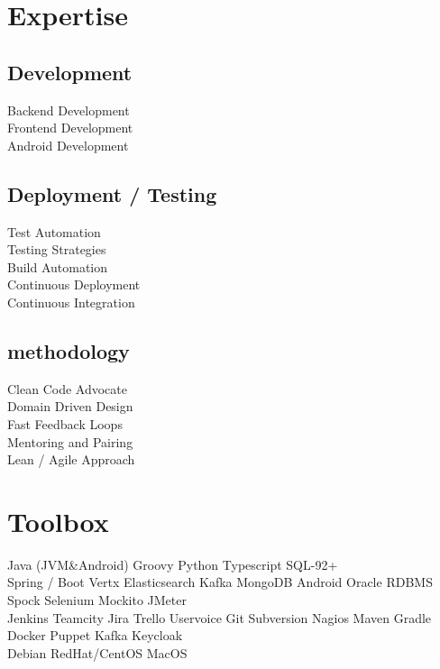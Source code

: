 \documentclass[]{resume}
\begin{document}
\begin{minipage}[t]{0.32\textwidth}

\section{Expertise}
\subsection{Development}
Backend Development \\
Frontend Development \\
Android Development \\
\sectionsep

\subsection{Deployment / Testing}
Test Automation \\
Testing Strategies \\
Build Automation \\
Continuous Deployment \\
Continuous Integration \\
\sectionsep

\subsection{methodology}
Clean Code Advocate \\
Domain Driven Design \\
Fast Feedback Loops \\
Mentoring and Pairing \\
Lean / Agile Approach \\
\sectionsep


\section{Toolbox}
Java (JVM\&Android) \textbullet{} Groovy \textbullet{} Python
\textbullet{} Typescript \textbullet{} SQL-92+\\
Spring / Boot \textbullet{} Vertx \textbullet{} Elasticsearch \textbullet{} Kafka \textbullet{} MongoDB \textbullet{} Android \textbullet{} Oracle RDBMS\\
Spock \textbullet{} Selenium \textbullet{} Mockito \textbullet{} JMeter\\
Jenkins \textbullet{} Teamcity \textbullet{} Jira \textbullet{} Trello
\textbullet{} Uservoice \textbullet{} Git \textbullet{} Subversion  \textbullet{} Nagios \textbullet{} Maven
\textbullet{} Gradle \textbullet{} Docker \textbullet{} Puppet \textbullet{} Kafka \textbullet{} Keycloak\\
Debian \textbullet{} RedHat/CentOS \textbullet{} MacOS
\sectionsep


\end{minipage}
\end{document}
